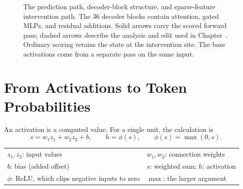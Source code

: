 \documentclass[12pt]{report}
\newcommand{\chref}[1]{Chapter~\uppercase\expandafter{\romannumeral\getrefnumber{#1}}}
\begin{document}
\begin{figure}[p]
\caption[Prediction architecture and intervention location]{The prediction
path, decoder-block structure, and sparse-feature intervention path.
The 36 decoder blocks contain attention, gated MLPs, and residual additions.
Solid arrows carry the scored forward pass; dashed arrows describe the
analysis and edit used in \chref{ch:mech}. Ordinary scoring retains the
state at the intervention site. The base activations come from a separate
pass on the same input.}
\label{fig:lm-architecture}
\label{fig:lm-mlp}
\end{figure}
\clearpage

\section{From Activations to Token Probabilities}
\label{sec:lm-softmax}
An activation is a computed value. For a single unit, the calculation is
\begin{equation}
s=w_1z_1+w_2z_2+b,\qquad h=\phi(s),\qquad
\phi(s)=\max(0,s).
\label{eq:lm-neuron}
\end{equation}
\noindent
\begin{tabular}{@{}ll@{}}
$z_1,z_2$: input values & $w_1,w_2$: connection weights \\
$b$: bias (added offset) & $s$: weighted sum; $h$: activation \\
$\phi$: ReLU, which clips negative inputs to zero & $\max$: the larger argument
\end{tabular}
\end{document}
